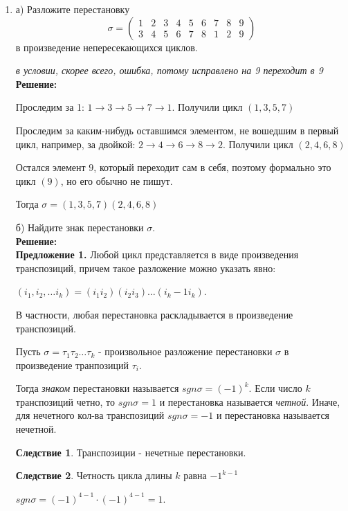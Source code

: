 \documentclass[]{book}
\theoremstyle{definition}
\begin{document}
\begin{enumerate}[resume]

\item а) Разложите перестановку 
$$\sigma = 
\begin{pmatrix} 
1 & 2 & 3 & 4 & 5 & 6 & 7 & 8 & 9 \\
3 & 4 & 5 & 6 & 7 & 8 & 1 & 2 & 9
\end{pmatrix}
$$
в произведение непересекающихся циклов.

\textit{в условии, скорее всего, ошибка, потому исправлено на 9 переходит в 9}\\

\textbf{Решение:}

Проследим за 1: $1 \rightarrow 3 \rightarrow 5 \rightarrow 7 \rightarrow 1$. Получили цикл $(1, 3, 5, 7)$

Проследим за каким-нибудь оставшимся элементом, не вошедшим в первый цикл, например, за двойкой: $2 \rightarrow 4 \rightarrow 6 \rightarrow 8 \rightarrow 2$. Получили цикл $(2, 4, 6, 8)$

Остался элемент $9$, который переходит сам в себя, поэтому формально это цикл $(9)$, но его обычно не пишут.

Тогда $\sigma = (1, 3, 5, 7)(2, 4, 6, 8) $

б) Найдите знак перестановки $\sigma$.\\
\textbf{Решение:}\\
\textbf{Предложение 1. } Любой цикл представляется в виде произведения транспозиций, причем такое разложение можно указать явно:

$(i_1,i_2,\ldots i_k) = (i_1 i_2)(i_2 i_3)\ldots(i_k-1 i_k)$.

В частности, любая перестановка раскладывается в произведение транспозиций.

Пусть $\sigma = \tau_1\tau_2\ldots\tau_k$ - произвольное разложение перестановки $\sigma$ в произведение транпозиций $\tau_i$.

Тогда \textit{знаком} перестановки называется $sgn\sigma = (-1)^k$. Если число $k$ транспозиций четно, то $sgn\sigma = 1$ и перестановка называется \textit{четной}. Иначе, для нечетного кол-ва транспозиций $sgn\sigma = -1$ и перестановка называется нечетной.

\textbf{Следствие 1}. Транспозиции - нечетные перестановки.

\textbf{Следствие 2}. Четность цикла длины $k$ равна $-1^{k - 1}$

$sgn\sigma = (-1)^{4-1}\cdot(-1)^{4-1} = 1$.


\end{enumerate}
\end{document}
